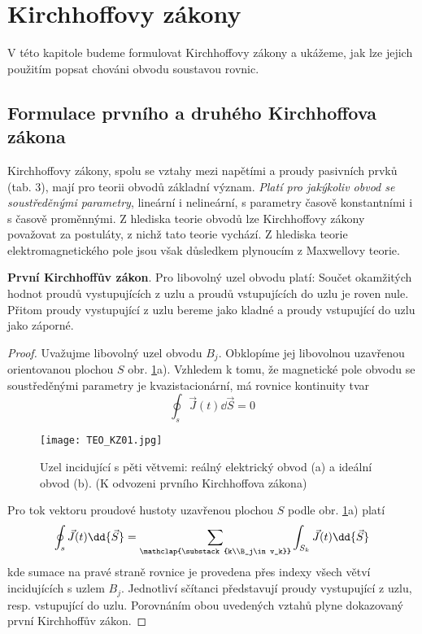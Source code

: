   \section{Kirchhoffovy zákony}
    V této kapitole budeme formulovat Kirchhoffovy zákony a ukážeme, jak lze jejich použitím popsat 
    chováni obvodu soustavou rovnic.
    
    \subsection{Formulace prvního a druhého Kirchhoffova zákona}
      Kirchhoffovy zákony, spolu se vztahy mezi napětími a proudy pasivních prvků (tab. 3), mají 
      pro teorii obvodů základní význam. \emph{Platí pro jakýkoliv obvod se soustředěnými 
      parametry}, lineární i nelineární, s parametry časově konstantními i s časově proměnnými. Z 
      hlediska teorie obvodů lze Kirchhoffovy zákony považovat za postuláty, z nichž tato teorie 
      vychází. Z hlediska teorie elektromagnetického pole jsou však důsledkem plynoucím z 
      Maxwellovy teorie.
      
      \textbf{První Kirchhoffův zákon}. Pro libovolný uzel obvodu platí: Součet okamžitých hodnot 
      proudů vystupujících z uzlu a proudů vstupujících do uzlu je roven nule. Přitom proudy 
      vystupující z uzlu bereme jako kladné a proudy vstupující do uzlu jako záporné.
      
      \begin{proof}
        Uvažujme libovolný uzel obvodu \(B_j\). Obklopíme jej libovolnou uzavřenou orientovanou 
        plochou \(S\) obr. \ref{TEO:fig_KZ01}a). Vzhledem k tomu, že magnetické pole obvodu se 
        soustředěnými parametry je kvazistacionární, má rovnice kontinuity tvar
        \begin{equation}
          \oint_s \vec{J}(t)\dd{\vec{S}} = 0
        \end{equation}
        \begin{figure}[ht!]
          \centering
          \texttt{[image: TEO\_KZ01.jpg]}
          \caption{Uzel incidující s pěti větvemi: reálný elektrický obvod (a) a ideální obvod (b). 
                   (K odvozeni prvního Kirchhoffova zákona) \cite[s.~47]{Meyer1978}}
          \label{TEO:fig_KZ01}
        \end{figure}      
        Pro tok vektoru proudové hustoty uzavřenou plochou \(S\) podle obr. \ref{TEO:fig_KZ01}a) 
        platí
        \begin{equation}
          \oint_s \vec{J}(t)\dd{\vec{S}} = \sum_{\mathclap{\substack{k\\B_j\in v_k}}}
                                           \int_{S_k} \vec{J}(t)\dd{\vec{S}} 
        \end{equation}
        kde sumace na pravé straně rovnice je provedena přes indexy všech větví incidujících s 
        uzlem \(B_j\). Jednotliví sčítanci představují proudy vystupující z uzlu, resp. vstupující 
        do uzlu. Porovnáním obou uvedených vztahů plyne dokazovaný první Kirchhoffův zákon.
      \end{proof}
      
